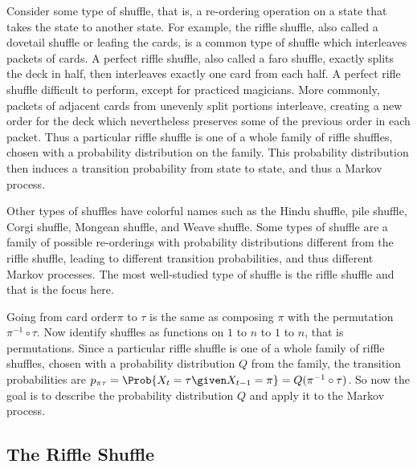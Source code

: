 \documentclass[12pt]{article}
\begin{document}
Consider some type of shuffle, that is, a re-ordering
operation on a state that takes the state to another state.  For
example, the riffle shuffle, also called a dovetail shuffle or leafing
the cards, is a common type of shuffle which
interleaves packets of cards.  A perfect riffle shuffle, also called a
faro shuffle, exactly splits
the deck in half, then interleaves exactly one card from each half.  A
perfect rifle shuffle difficult to
perform, except for practiced magicians.  More commonly, packets of
adjacent cards from  unevenly split portions interleave, creating a
new order for the deck which nevertheless preserves some of the
previous order in each packet.  Thus a particular riffle shuffle is one of a
whole family of riffle shuffles, chosen  with a probability
distribution on the family.  This probability distribution then
induces a transition probability from state to state, and thus a
Markov process.

Other types of shuffles have colorful names such as the Hindu shuffle,
pile shuffle, Corgi shuffle, Mongean shuffle, and Weave shuffle.
Some types of shuffle are a family of possible re-orderings
with probability distributions different from the riffle
shuffle, leading to different transition probabilities, and thus
different Markov processes.  The most well-studied type of shuffle is
the riffle shuffle and that is the focus here.

Going from card order\( \pi \) to \( \tau \) is
the same as composing \( \pi \) with the permutation \( \pi^{-1} \circ
\tau \).  Now identify shuffles as functions on  \( 1 \) to \( n \) to
\( 1 \) to \( n \),  that is permutations.
Since a particular riffle shuffle is one of a
whole family of riffle shuffles, chosen  with a probability
distribution \( Q \) from the family,
the transition probabilities are \( p_{\pi \tau} = \Prob{X_t =
\tau \given X_{t-1} = \pi} = Q(\pi^{-1} \circ \tau) \).  So now the
goal is to describe the probability distribution \( Q \) and apply it
to the Markov process.


\subsection*{The Riffle Shuffle}
\end{document}
